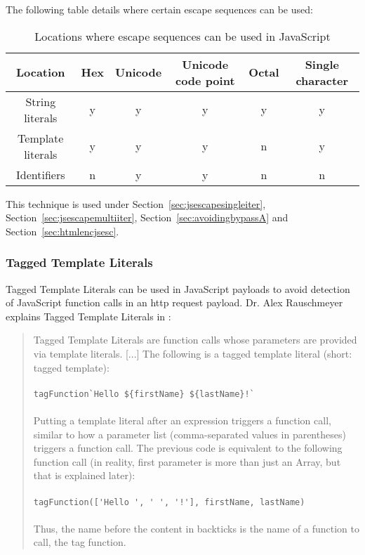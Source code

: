 The following table details where certain escape sequences can be used:

\begin{table}[h!]
	\centering
	\begin{tabular}{|c||c| c| c| c|c|}
		\hline
		Location          & Hex & Unicode & Unicode code point & Octal & Single character \\
		\hline\hline
		String literals   & y   & y       & y                  & y     & y                \\
		Template literals & y   & y       & y                  & n     & y                \\
		Identifiers       & n   & y       & y                  & n     & n                \\
		\hline
	\end{tabular}
	\caption{Locations where escape sequences can be used in JavaScript}
\end{table}
\cite{exploringes6/escapeseq,bynens/escape,js/lexicalgrammar}

This technique is used under Section~\ref{sec:jsescapesingleiter}, Section~\ref{sec:jsescapemultiiter}, Section~\ref{sec:avoidingbypassA} and Section~\ref{sec:htmlencjsesc}.


\subsubsection{Tagged Template Literals}
\label{sec:taggedtemplateliterals}
Tagged Template Literals can be used in JavaScript payloads to avoid detection of JavaScript function calls in an \acrshort{http} request payload. Dr. Alex Rauschmeyer explains Tagged Template Literals in :
\begin{quotation} Tagged Template Literals are function calls whose parameters are provided via template literals. [...]
	The following is a tagged template literal (short: tagged template): \\\\
	\verb|tagFunction`Hello ${firstName} ${lastName}!`| \\\\
	Putting a template literal after an expression triggers a function call, similar to how a parameter list (comma-separated values in parentheses) triggers a function call. The previous code is equivalent to the following function call (in reality, first parameter is more than just an Array, but that is explained later): \\\\
	\verb|tagFunction(['Hello ', ' ', '!'], firstName, lastName)| \\\\
	Thus, the name before the content in backticks is the name of a function to call, the tag function.
	\cite{exploringes6/templatelit}
\end{quotation}

